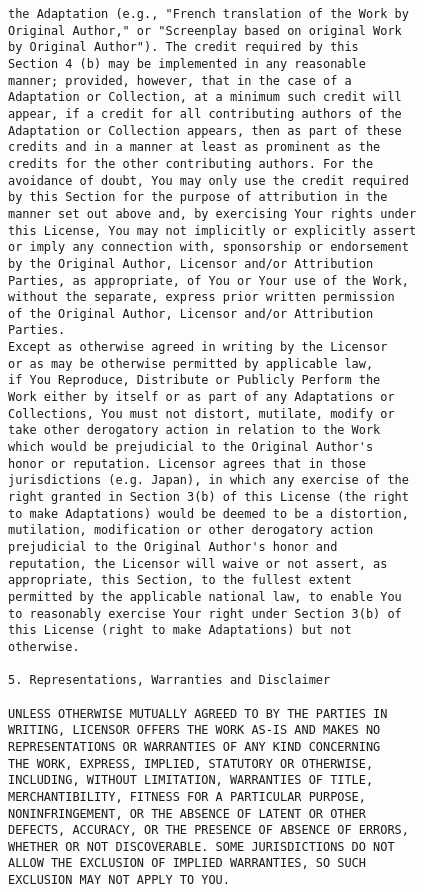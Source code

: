 \begin{verbatim}
the Adaptation (e.g., "French translation of the Work by
Original Author," or "Screenplay based on original Work
by Original Author"). The credit required by this
Section 4 (b) may be implemented in any reasonable
manner; provided, however, that in the case of a
Adaptation or Collection, at a minimum such credit will
appear, if a credit for all contributing authors of the
Adaptation or Collection appears, then as part of these
credits and in a manner at least as prominent as the
credits for the other contributing authors. For the
avoidance of doubt, You may only use the credit required
by this Section for the purpose of attribution in the
manner set out above and, by exercising Your rights under
this License, You may not implicitly or explicitly assert
or imply any connection with, sponsorship or endorsement
by the Original Author, Licensor and/or Attribution
Parties, as appropriate, of You or Your use of the Work,
without the separate, express prior written permission
of the Original Author, Licensor and/or Attribution
Parties.
Except as otherwise agreed in writing by the Licensor
or as may be otherwise permitted by applicable law,
if You Reproduce, Distribute or Publicly Perform the
Work either by itself or as part of any Adaptations or
Collections, You must not distort, mutilate, modify or
take other derogatory action in relation to the Work
which would be prejudicial to the Original Author's
honor or reputation. Licensor agrees that in those
jurisdictions (e.g. Japan), in which any exercise of the
right granted in Section 3(b) of this License (the right
to make Adaptations) would be deemed to be a distortion,
mutilation, modification or other derogatory action
prejudicial to the Original Author's honor and
reputation, the Licensor will waive or not assert, as
appropriate, this Section, to the fullest extent
permitted by the applicable national law, to enable You
to reasonably exercise Your right under Section 3(b) of
this License (right to make Adaptations) but not
otherwise.

5. Representations, Warranties and Disclaimer

UNLESS OTHERWISE MUTUALLY AGREED TO BY THE PARTIES IN
WRITING, LICENSOR OFFERS THE WORK AS-IS AND MAKES NO
REPRESENTATIONS OR WARRANTIES OF ANY KIND CONCERNING
THE WORK, EXPRESS, IMPLIED, STATUTORY OR OTHERWISE,
INCLUDING, WITHOUT LIMITATION, WARRANTIES OF TITLE,
MERCHANTIBILITY, FITNESS FOR A PARTICULAR PURPOSE,
NONINFRINGEMENT, OR THE ABSENCE OF LATENT OR OTHER
DEFECTS, ACCURACY, OR THE PRESENCE OF ABSENCE OF ERRORS,
WHETHER OR NOT DISCOVERABLE. SOME JURISDICTIONS DO NOT
ALLOW THE EXCLUSION OF IMPLIED WARRANTIES, SO SUCH
EXCLUSION MAY NOT APPLY TO YOU.


\end{verbatim}
